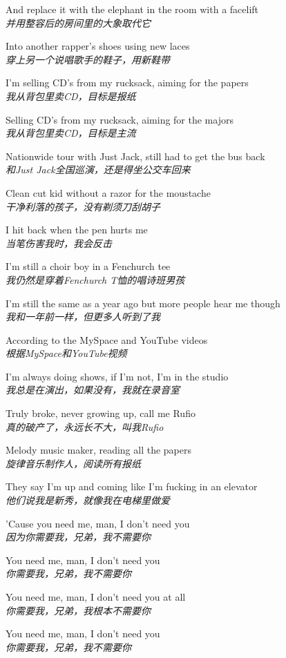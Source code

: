 \begin{spacing}{1.5}
\begin{flushleft}
And replace it with the elephant in the room with a facelift\\
\textit{并用整容后的房间里的大象取代它}\lyricspace

Into another rapper's shoes using new laces\\
\textit{穿上另一个说唱歌手的鞋子，用新鞋带}\lyricspace

I'm selling CD's from my rucksack, aiming for the papers\\
\textit{我从背包里卖CD，目标是报纸}\lyricspace

Selling CD's from my rucksack, aiming for the majors\\
\textit{我从背包里卖CD，目标是主流}\lyricspace

Nationwide tour with Just Jack, still had to get the bus back\\
\textit{和Just Jack全国巡演，还是得坐公交车回来}\lyricspace

Clean cut kid without a razor for the moustache\\
\textit{干净利落的孩子，没有剃须刀刮胡子}\lyricspace

I hit back when the pen hurts me\\
\textit{当笔伤害我时，我会反击}\lyricspace

I'm still a choir boy in a Fenchurch tee\\
\textit{我仍然是穿着Fenchurch T恤的唱诗班男孩}\lyricspace

I'm still the same as a year ago but more people hear me though\\
\textit{我和一年前一样，但更多人听到了我}\lyricspace

According to the MySpace and YouTube videos\\
\textit{根据MySpace和YouTube视频}\lyricspace

I'm always doing shows, if I'm not, I'm in the studio\\
\textit{我总是在演出，如果没有，我就在录音室}\lyricspace

Truly broke, never growing up, call me Rufio\\
\textit{真的破产了，永远长不大，叫我Rufio}\lyricspace

Melody music maker, reading all the papers\\
\textit{旋律音乐制作人，阅读所有报纸}\lyricspace

They say I'm up and coming like I'm fucking in an elevator\\
\textit{他们说我是新秀，就像我在电梯里做爱}\lyricspace

'Cause you need me, man, I don't need you\\
\textit{因为你需要我，兄弟，我不需要你}\lyricspace

You need me, man, I don't need you\\
\textit{你需要我，兄弟，我不需要你}\lyricspace

You need me, man, I don't need you at all\\
\textit{你需要我，兄弟，我根本不需要你}\lyricspace

You need me, man, I don't need you\\
\textit{你需要我，兄弟，我不需要你}\lyricspace
\end{flushleft}
\end{spacing}
